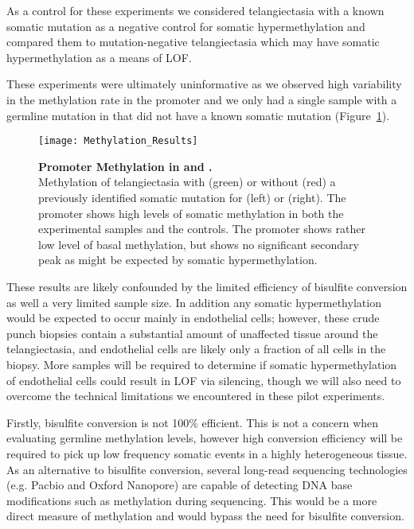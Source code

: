 As a control for these experiments we considered telangiectasia with a known somatic mutation as a negative control for somatic hypermethylation and compared them to mutation-negative telangiectasia which may have somatic hypermethylation as a means of LOF.

These experiments were ultimately uninformative as we observed high variability in the methylation rate in the  promoter and we only had a single sample with a germline mutation in  that did not have a known somatic mutation (Figure~\ref{Methylation_Results}). 
\begin{figure}[tbp!]
\begin{center}
\texttt{[image: Methylation\_Results]}
\end{center}
\caption[Promoter Methylation in  and ]{\textbf{Promoter Methylation in  and .} \\  Methylation of telangiectasia with (green) or without (red) a previously identified somatic mutation for  (left) or  (right). The  promoter shows high levels of somatic methylation in both the experimental samples and the controls. The  promoter shows rather low level of basal methylation, but shows no significant secondary peak as might be expected by somatic hypermethylation.}
\label{Methylation_Results}
\end{figure}
These results are likely confounded by the limited efficiency of bisulfite conversion as well a very limited sample size. In addition any somatic hypermethylation would be expected to occur mainly in endothelial cells; however, these crude punch biopsies contain a substantial amount of unaffected tissue around the telangiectasia, and endothelial cells are likely only a fraction of all cells in the biopsy. More samples will be required to determine if somatic hypermethylation of endothelial cells could result in LOF via silencing, though we will also need to overcome the technical limitations we encountered in these pilot experiments. 

Firstly, bisulfite conversion is not 100\% efficient. This is not a concern when evaluating germline methylation levels, however high conversion efficiency will be required to pick up low frequency somatic events in a highly heterogeneous tissue. As an alternative to bisulfite conversion, several long-read sequencing technologies (e.g. Pacbio and Oxford Nanopore) are capable of detecting DNA base modifications such as methylation during sequencing. This would be a more direct measure of methylation and would bypass the need for bisulfite conversion.

